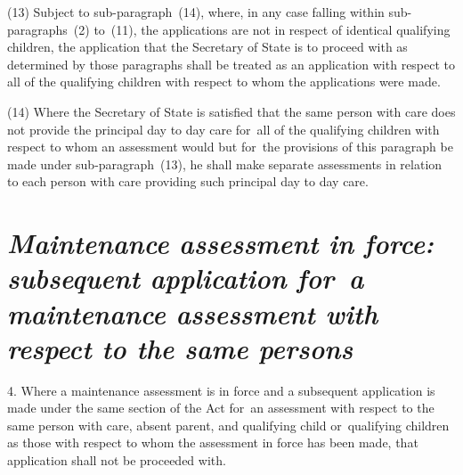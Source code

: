 \documentclass[a4paper,12pt]{article}
\begin{document}
(13) Subject to sub-paragraph~(14), where, in any case falling within sub-paragraphs~(2) to~(11), the applications are not in respect of identical qualifying children, the application that 
the Secretary of State  %
is to proceed with as determined by those paragraphs shall be treated as an application with respect to all of the qualifying children with respect to whom the applications were made.

(14) Where 
the Secretary of State  %
is satisfied that the same person with care does not provide the principal day to day care for~all of the qualifying children with respect to whom an assessment would but for~the provisions of this paragraph be made under sub-paragraph~(13), he shall make separate assessments in relation to each person with care providing such principal day to day care.


\section*{\itshape Maintenance assessment in force: subsequent application for~a maintenance assessment with respect to the same persons}

4.  Where a maintenance assessment is in force and a subsequent application is made under the same section of the Act for~an assessment with respect to the same person with care, absent parent, and qualifying child or~qualifying children as those with respect to whom the assessment in force has been made, that application shall not be proceeded with. 

\end{document}
